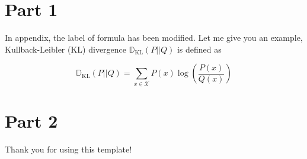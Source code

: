 \section{Part 1}\label{Appendix_A}
In appendix, the label of formula has been modified. Let me give you an example, Kullback-Leibler (KL) divergence $\mathbb{D}_{\mathrm{KL}}(P|| Q)$ is defined as

\begin{equation}
    \mathbb{D}_{\text{KL}}(P || Q)= \sum_{x \in \mathcal{X}} P(x)\log \left( \frac{P(x)}{Q(x)} \right) 
\end{equation}

\section{Part 2}\label{Appendix_B}
Thank you for using this template!





